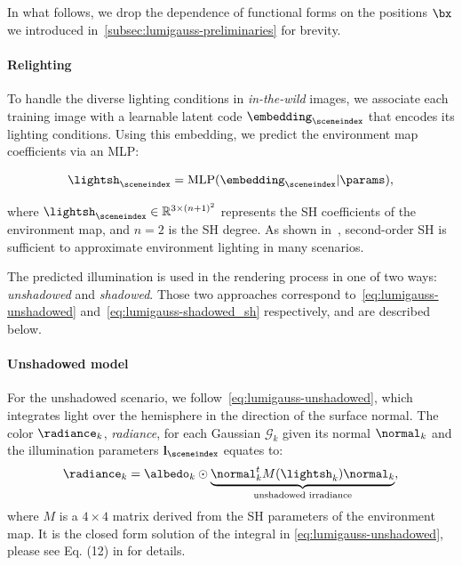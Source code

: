     In what follows, we drop the dependence of functional forms on the positions
    $\bx$ we introduced in~\cref{subsec:lumigauss-preliminaries} for brevity.

    \paragraph{Relighting}
      To handle the diverse lighting conditions in \textit{in-the-wild} images, we
      associate each training image with a learnable latent code
      $\embedding_\sceneindex$ that encodes its lighting conditions.
      Using this embedding, we predict the environment map coefficients via an MLP:

      \begin{equation} \label{eq:lumigauss-lightsh} \lightsh_\sceneindex = \text{MLP}(\embedding_\sceneindex | \params), \end{equation}

      where $\lightsh_\sceneindex \in \mathbb{R}^{3 \times (n+1)^2}$ represents the SH coefficients of the environment map, and $n{=}2$ is the SH degree.
      As shown in~\cite{ramamoorthi2001envmap}, second-order SH is sufficient to
      approximate environment lighting in many scenarios.

      The predicted illumination is used in the rendering process in one of two
      ways: \textit{unshadowed} and \textit{shadowed}.
      Those two approaches correspond to~\cref{eq:lumigauss-unshadowed}
      and~\cref{eq:lumigauss-shadowed_sh} respectively, and are described below.

    \paragraph{Unshadowed model}
      For the unshadowed scenario, we follow~\cref{eq:lumigauss-unshadowed}, which
      integrates light over the hemisphere in the direction of the surface normal.
      The color $\radiance_k$, \textit{radiance}, for each Gaussian $\mathcal{G}_k$ given its normal $\normal_k$ and the illumination parameters $\mathbf{l}_\sceneindex$ equates to:
      \begin{equation}
        \label{eq:lumigauss-unshadowed-radiance}
        \radiance_k = \albedo_k \odot \underbrace{\normal_k^t M(\lightsh_k) \normal_k}_{\text{unshadowed irradiance}},
      \end{equation}
      where $M$ is a $4{\times}4$ matrix derived from the SH parameters of the environment map.
      It is the closed form solution of the integral in
      \cref{eq:lumigauss-unshadowed}, please see Eq.
      (12) in \cite{ramamoorthi2001envmap} for details.

